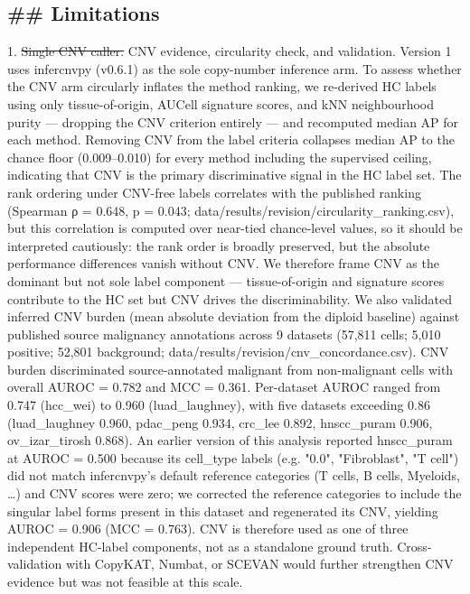 \documentclass[11pt]{article}
\newcommand{\added}[1]{{\color{trackred}#1}}
\newcommand{\deleted}[1]{{\color{trackred}\sout{#1}}}
\begin{document}
\subsection*{\#\# Limitations}
1. \deleted{Single CNV caller.} \added{CNV evidence, circularity check, and validation.} Version 1 uses infercnvpy \added{(v0.6.1)} as the sole copy-number inference arm. \added{To assess whether the CNV arm circularly inflates the method ranking, we re-derived HC labels using only tissue-of-origin, AUCell signature scores, and kNN neighbourhood purity — dropping the CNV criterion entirely — and recomputed median AP for each method. Removing CNV from the label criteria collapses median AP to the chance floor (0.009–0.010) for every method including the supervised ceiling, indicating that CNV is the primary discriminative signal in the HC label set. The rank ordering under CNV-free labels correlates with the published ranking (Spearman ρ = 0.648, p = 0.043; data/results/revision/circularity\_ranking.csv), but this correlation is computed over near-tied chance-level values, so it should be interpreted cautiously: the rank order is broadly preserved, but the absolute performance differences vanish without CNV. We therefore frame CNV as the dominant but not sole label component — tissue-of-origin and signature scores contribute to the HC set but CNV drives the discriminability. We also validated inferred CNV burden (mean absolute deviation from the diploid baseline) against published source malignancy annotations across 9 datasets (57,811 cells; 5,010 positive; 52,801 background; data/results/revision/cnv\_concordance.csv). CNV burden discriminated source-annotated malignant from non-malignant cells with overall AUROC = 0.782 and MCC = 0.361. Per-dataset AUROC ranged from 0.747 (hcc\_wei) to 0.960 (luad\_laughney), with five datasets exceeding 0.86 (luad\_laughney 0.960, pdac\_peng 0.934, crc\_lee 0.892, hnscc\_puram 0.906, ov\_izar\_tirosh 0.868). An earlier version of this analysis reported hnscc\_puram at AUROC = 0.500 because its cell\_type labels (e.g. "0.0", "Fibroblast", "T cell") did not match infercnvpy's default reference categories (T cells, B cells, Myeloids, …) and CNV scores were zero; we corrected the reference categories to include the singular label forms present in this dataset and regenerated its CNV, yielding AUROC = 0.906 (MCC = 0.763). CNV is therefore used as one of three independent HC-label components, not as a standalone ground truth.} Cross-validation with CopyKAT, Numbat, or SCEVAN would \added{further} strengthen CNV evidence but was not feasible at this scale.
\end{document}

